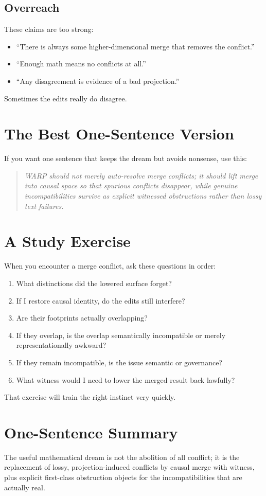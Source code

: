 \documentclass[11pt]{article}
\theoremstyle{definition}
\begin{document}
\subsection{Overreach}

These claims are too strong:
\begin{itemize}[leftmargin=2em]
\item ``There is always some higher-dimensional merge that removes the
  conflict.''
\item ``Enough math means no conflicts at all.''
\item ``Any disagreement is evidence of a bad projection.''
\end{itemize}

Sometimes the edits really do disagree.

\section{The Best One-Sentence Version}

If you want one sentence that keeps the dream but avoids nonsense, use this:

\begin{quote}
\emph{WARP should not merely auto-resolve merge conflicts; it should lift
merge into causal space so that spurious conflicts disappear, while genuine
incompatibilities survive as explicit witnessed obstructions rather than lossy
text failures.}
\end{quote}

\section{A Study Exercise}

When you encounter a merge conflict, ask these questions in order:
\begin{enumerate}[leftmargin=2em]
\item What distinctions did the lowered surface forget?
\item If I restore causal identity, do the edits still interfere?
\item Are their footprints actually overlapping?
\item If they overlap, is the overlap semantically incompatible or merely
  representationally awkward?
\item If they remain incompatible, is the issue semantic or governance?
\item What witness would I need to lower the merged result back lawfully?
\end{enumerate}

That exercise will train the right instinct very quickly.

\section{One-Sentence Summary}

The useful mathematical dream is not the abolition of all conflict; it is the
replacement of lossy, projection-induced conflicts by causal merge with witness,
plus explicit first-class obstruction objects for the incompatibilities that are
actually real.
\end{document}
